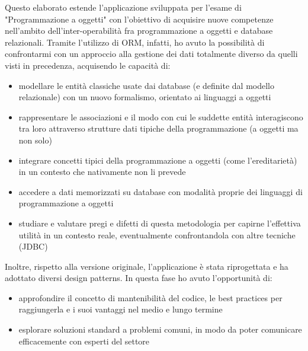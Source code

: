 Questo elaborato estende l'applicazione sviluppata per l'esame di "Programmazione a oggetti" con l'obiettivo di acquisire nuove competenze nell'ambito dell'inter-operabilità fra programmazione a oggetti e database relazionali. Tramite l'utilizzo di ORM, infatti, ho avuto la possibilità di confrontarmi con un approccio alla gestione dei dati totalmente diverso da quelli visti in precedenza, acquisendo le capacità di: 
\begin{itemize}
\item modellare le entità classiche usate dai database (e definite dal modello relazionale) con un nuovo formalismo, orientato ai linguaggi a oggetti
\item rappresentare le associazioni e il modo con cui le suddette entità interagiscono tra loro attraverso strutture dati tipiche della programmazione (a oggetti ma non solo)
\item integrare concetti tipici della programmazione a oggetti (come l'ereditarietà) in un contesto che nativamente non li prevede
\item accedere a dati memorizzati su database con modalità proprie dei linguaggi di programmazione a oggetti
\item studiare e valutare pregi e difetti di questa metodologia per capirne l'effettiva utilità in un contesto reale, eventualmente confrontandola con altre tecniche (JDBC)
\end{itemize}

Inoltre, rispetto alla versione originale, l'applicazione è stata riprogettata e ha adottato diversi design patterns. In questa fase ho avuto l'opportunità di:
\begin{itemize}
  \item approfondire il concetto di mantenibilità del codice, le best practices per raggiungerla e i suoi vantaggi nel medio e lungo termine
  \item esplorare soluzioni standard a problemi comuni, in modo da poter comunicare efficacemente con esperti del settore
\end{itemize}